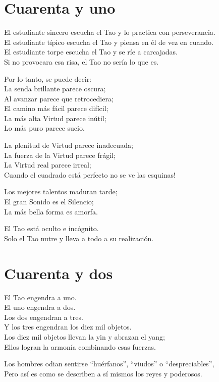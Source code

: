 \documentclass[book,b5paper,hidelinks,final]{memoir}
\begin{document}
	\chapter*{Cuarenta y uno}
	
	El estudiante sincero escucha el Tao y lo practica con perseverancia.\\
	El estudiante típico escucha el Tao y piensa en él de vez en cuando.\\
	El estudiante torpe escucha el Tao y se ríe a carcajadas.\\
	Si no provocara esa risa, el Tao no sería lo que es.
	
	Por lo tanto, se puede decir:\\
	La senda brillante parece oscura;\\
	Al avanzar parece que retrocediera;\\
	El camino más fácil parece difícil;\\
	La más alta Virtud parece inútil;\\
	Lo más puro parece sucio.
	
	La plenitud de Virtud parece inadecuada;\\
	La fuerza de la Virtud parece frágil;\\
	La Virtud real parece irreal;\\
	Cuando el cuadrado está perfecto no se ve las esquinas!
	
	Los mejores talentos maduran tarde;\\
	El gran Sonido es el Silencio;\\
	La más bella forma es amorfa.
	
	El Tao está oculto e incógnito.\\
	Solo el Tao nutre y lleva a todo a su realización.
	
	\chapter*{Cuarenta y dos}
	
	El Tao engendra a uno.\\
	El uno engendra a dos.\\
	Los dos engendran a tres.\\
	Y los tres engendran los diez mil objetos.\\
	Los diez mil objetos llevan la yin y abrazan el yang;\\
	Ellos logran la armonía combinando esas fuerzas.
	
	Los hombres odian sentirse ``huérfanos'', ``viudos'' o
	``despreciables'',\\
	Pero así es como se describen a sí mismos los reyes y poderosos.
	
\end{document}
